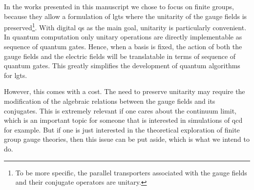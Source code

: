 In the works presented in this manuscript \cite{pradhan2022ladder, pradhan_unpublished} we chose to focus on finite groups, because they allow a formulation of \acp{lgt} where the unitarity of the gauge fields is preserved\footnote{To be more specific, the parallel transporters associated with the gauge fields and their conjugate operators are unitary.}.
With digital \ac{qs} as the main goal, unitarity is particularly convenient.
In quantum computation only unitary operations are directly implementable as sequence of quantum gates.
Hence, when a basis is fixed, the action of both the gauge fields and the electric fields will be translatable in terms of sequence of quantum gates.
This greatly simplifies the development of quantum algorithms for \acp{lgt}.

However, this comes with a cost.
The need to preserve unitarity may require the modification of the algebraic relations between the gauge fields and its conjugates.
This is extremely relevant if one cares about the continuum limit, which is an important topic for someone that is interested in simulations of \ac{qcd} for example.
But if one is just interested in the theoretical exploration of finite group gauge theories, then this issue can be put aside, which is what we intend to do.
